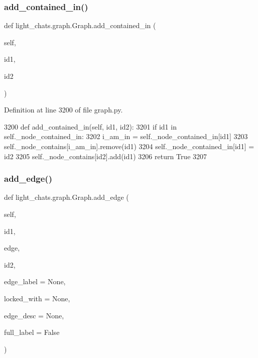 \subsubsection{\texorpdfstring{add\+\_\+contained\+\_\+in()}{add\_contained\_in()}}
{\footnotesize\ttfamily def light\+\_\+chats.\+graph.\+Graph.\+add\+\_\+contained\+\_\+in (\begin{DoxyParamCaption}\item[{}]{self,  }\item[{}]{id1,  }\item[{}]{id2 }\end{DoxyParamCaption})}



Definition at line 3200 of file graph.\+py.


\begin{DoxyCode}
3200     \textcolor{keyword}{def }add\_contained\_in(self, id1, id2):
3201         \textcolor{keywordflow}{if} id1 \textcolor{keywordflow}{in} self.\_node\_contained\_in:
3202             i\_am\_in = self.\_node\_contained\_in[id1]
3203             self.\_node\_contains[i\_am\_in].remove(id1)
3204         self.\_node\_contained\_in[id1] = id2
3205         self.\_node\_contains[id2].add(id1)
3206         \textcolor{keywordflow}{return} \textcolor{keyword}{True}
3207 
\end{DoxyCode}
\mbox{\label{classlight__chats_1_1graph_1_1Graph_ab343f587ca9bf3b7576fbe93e537dbca}} 
\subsubsection{\texorpdfstring{add\+\_\+edge()}{add\_edge()}}
{\footnotesize\ttfamily def light\+\_\+chats.\+graph.\+Graph.\+add\+\_\+edge (\begin{DoxyParamCaption}\item[{}]{self,  }\item[{}]{id1,  }\item[{}]{edge,  }\item[{}]{id2,  }\item[{}]{edge\+\_\+label = {\ttfamily None},  }\item[{}]{locked\+\_\+with = {\ttfamily None},  }\item[{}]{edge\+\_\+desc = {\ttfamily None},  }\item[{}]{full\+\_\+label = {\ttfamily False} }\end{DoxyParamCaption})}

